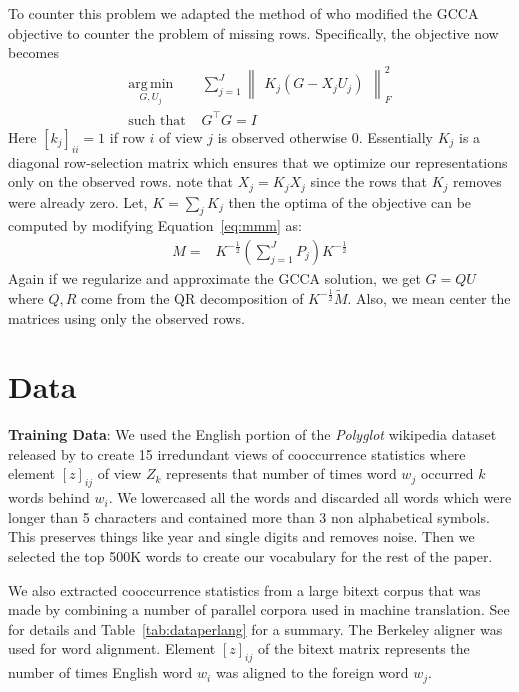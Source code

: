 \documentclass[11pt]{article}
\begin{document}
To counter this problem we adapted the method of
\cite{van2006generalized} who modified the GCCA objective to counter the problem of missing
rows. Specifically, the objective now becomes
\begin{equation}
  \label{eq:gcca2}
\begin{split}
  \operatorname*{arg\,min}_{G,U_j} & \sum_{j=1}^J \begin{Vmatrix} K_j(G - X_jU_j) \end{Vmatrix}^2_F \\
  \text{such that } & G^\top G = I
\end{split}
\end{equation}
Here $[k_j]_{ii} = 1$  if row $i$ of view $j$ is observed otherwise $0$.
Essentially $K_j$ is a diagonal row-selection matrix which ensures
that we optimize our representations only on the observed rows. note that
$X_j = K_jX_j$ since the rows that $K_j$ removes were already zero. Let, $K =
\sum_j K_j$ then the optima
of the objective can be computed by modifying Equation~\ref{eq:mmm} as:
\begin{align}
  M =& K^{-\frac{1}{2}}(\sum_{j=1}^J P_j)K^{-\frac{1}{2}}
\end{align}
Again if we regularize and approximate the GCCA solution, we get
$G=QU$ where $Q, R$ come from the QR decomposition of
$K^{-\frac{1}{2}}\tilde{M}$. Also, we mean center the matrices using
only the observed rows.

\section{Data}
\label{sec:data}
\textbf{Training Data}: We used the English portion of the \textit{Polyglot} wikipedia dataset
released by \cite{al2013polyglot} to create 15 irredundant views of
cooccurrence statistics where element $[z]_{ij}$ of view $Z_k$
represents that number of times word $w_j$ occurred $k$ words behind
$w_i$. We lowercased all the words and discarded all
words which were longer than 5 characters and contained more than 3 non
alphabetical symbols. This preserves things like year and single
digits and removes noise. Then we selected the top 500K words to
create our vocabulary for the rest of the paper.

We also extracted cooccurrence
statistics from a large bitext corpus that was made by combining a
number of parallel corpora used in machine translation. See
\cite{ganitkevitch2013ppdb} for details and
Table~\ref{tab:dataperlang} for a summary.
The Berkeley aligner was used for word alignment. Element
$[z]_{ij}$ of the bitext matrix represents the number of times English
word $w_i$ was aligned to the foreign word $w_j$.
\end{document}
